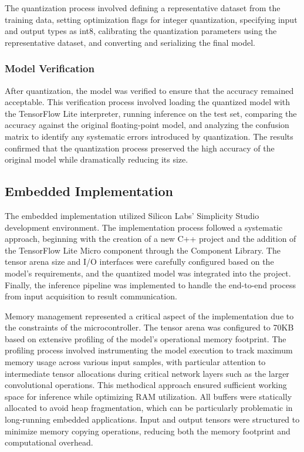 \documentclass[
  9pt,
  letterpaper,
  abstract,
  titlepage]{scrbook}
\begin{document}
The quantization process involved defining a representative dataset from
the training data, setting optimization flags for integer quantization,
specifying input and output types as int8, calibrating the quantization
parameters using the representative dataset, and converting and
serializing the final model.

\subsubsection{Model Verification}\label{model-verification}

After quantization, the model was verified to ensure that the accuracy
remained acceptable. This verification process involved loading the
quantized model with the TensorFlow Lite interpreter, running inference
on the test set, comparing the accuracy against the original
floating-point model, and analyzing the confusion matrix to identify any
systematic errors introduced by quantization. The results confirmed that
the quantization process preserved the high accuracy of the original
model while dramatically reducing its size.

\subsection{Embedded Implementation}\label{embedded-implementation}

The embedded implementation utilized Silicon Labs' Simplicity Studio
development environment. The implementation process followed a
systematic approach, beginning with the creation of a new C++ project
and the addition of the TensorFlow Lite Micro component through the
Component Library. The tensor arena size and I/O interfaces were
carefully configured based on the model's requirements, and the
quantized model was integrated into the project. Finally, the inference
pipeline was implemented to handle the end-to-end process from input
acquisition to result communication.

Memory management represented a critical aspect of the implementation
due to the constraints of the microcontroller. The tensor arena was
configured to 70KB based on extensive profiling of the model's
operational memory footprint. The profiling process involved
instrumenting the model execution to track maximum memory usage across
various input samples, with particular attention to intermediate tensor
allocations during critical network layers such as the larger
convolutional operations. This methodical approach ensured sufficient
working space for inference while optimizing RAM utilization. All
buffers were statically allocated to avoid heap fragmentation, which can
be particularly problematic in long-running embedded applications. Input
and output tensors were structured to minimize memory copying
operations, reducing both the memory footprint and computational
overhead.
\end{document}
